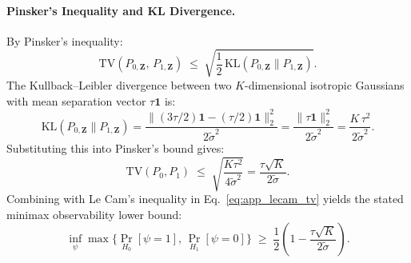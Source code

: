 \documentclass[preprint,12pt]{elsarticle}
\theoremstyle{plain}
\theoremstyle{definition}
\theoremstyle{remark}
\begin{document}
\paragraph{Pinsker's Inequality and KL Divergence.} By Pinsker's inequality:
\begin{equation}
\mathrm{TV}(P_{0,\bm{Z}},\, P_{1,\bm{Z}}) \;\le\; \sqrt{\frac{1}{2}\,\mathrm{KL}(P_{0,\bm{Z}} \parallel P_{1,\bm{Z}})}.
\end{equation}
The Kullback--Leibler divergence between two $K$-dimensional isotropic Gaussians with mean separation vector $\tau\bm{1}$ is:
\begin{equation}
\mathrm{KL}(P_{0,\bm{Z}} \parallel P_{1,\bm{Z}}) = \frac{\lVert (3\tau/2)\bm{1} - (\tau/2)\bm{1} \rVert_2^2}{2\tilde\sigma^2} = \frac{\lVert \tau\bm{1} \rVert_2^2}{2\tilde\sigma^2} = \frac{K\,\tau^2}{2\tilde\sigma^2}.
\end{equation}
Substituting this into Pinsker's bound gives:
\begin{equation}
\mathrm{TV}(P_0, P_1) \;\le\; \sqrt{\frac{K\tau^2}{4\tilde\sigma^2}} = \frac{\tau\sqrt{K}}{2\tilde\sigma}.
\end{equation}
Combining with Le Cam's inequality in Eq.~\eqref{eq:app_lecam_tv} yields the stated minimax observability lower bound:
\begin{equation}
\inf_\psi \max\big\{\Pr_{H_0}[\psi = 1],\,\Pr_{H_1}[\psi = 0]\big\} \;\ge\; \frac{1}{2}\left(1 - \frac{\tau\sqrt{K}}{2\tilde\sigma}\right).
\end{equation}
\end{document}
